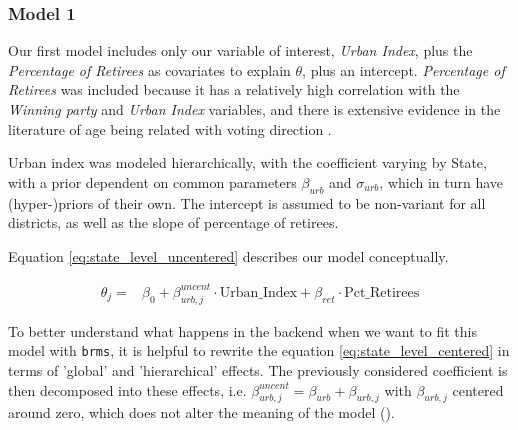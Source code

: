 \documentclass[12pt]{article}
\newcommand{\red}[1]{\textcolor{red}{#1}}
\newcommand{\blue}[1]{\textcolor{blue}{#1}}
\begin{document}
\subsubsection*{Model 1}


Our first model includes only our variable of interest, \textit{Urban Index}, plus the \textit{Percentage of Retirees} as covariates to explain $\theta$, plus an intercept. \textit{Percentage of Retirees} was included because it has a relatively high correlation with the \textit{Winning party} and \textit{Urban Index} variables, and there is extensive evidence in the literature of age being related with voting direction \parencite{brown2022oldvoters}.  


Urban index was modeled hierarchically, with the coefficient varying by State, with a prior dependent on common parameters $\beta_{urb}$ and $\sigma_{urb}$, which in turn have (hyper-)priors of their own. The intercept is assumed to be non-variant for all districts, as well as the slope of percentage of retirees.

Equation \ref{eq:state_level_uncentered} describes our model conceptually.


\begin{equation} \label{eq:state_level_uncentered}
	\begin{aligned}
		\theta_{j} =    &\beta_0 + \beta_{urb,j}^{uncent} \cdot \text{Urban\_Index} + \beta_{ret} \cdot \text{Pct\_Retirees}
	\end{aligned}
\end{equation}

To better understand what happens in the backend when we want to fit this model with \verb|brms|, it is helpful to rewrite the equation \ref{eq:state_level_centered} in terms of 'global' and 'hierarchical' effects. The previously considered coefficient is then decomposed into these effects, i.e.
$\beta_{urb,j}^{uncent} = \beta_{urb} + \beta_{urb,j}$
with $\beta_{urb,j}$ centered around zero, which does not alter the meaning of the model (\cite{brmsbook}).
\end{document}
